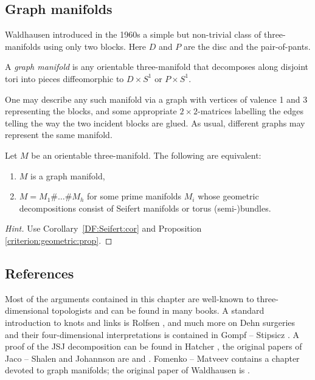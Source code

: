 \subsection{Graph manifolds}
Waldhausen introduced in the 1960s a simple but non-trivial class of three-manifolds using only two blocks. Here $D$ and $P$ are the disc and the pair-of-pants.

\begin{defn}
A \emph{graph manifold} is any orientable three-manifold that decomposes along disjoint tori into pieces diffeomorphic to $D\times S^1$ or $P\times S^1$.
\end{defn}

One may describe any such manifold via a graph with vertices of valence 1 and 3 representing the blocks, and some appropriate $2\times 2$-matrices labelling the edges telling the way the two incident blocks are glued. As usual, different graphs may represent the same manifold. 

\begin{ex}
Let $M$ be an orientable three-manifold. The following are equivalent:
\begin{enumerate}
\item $M$ is a graph manifold,
\item $M=M_1\#\ldots \#M_h$ for some prime manifolds $M_i$ whose geometric decompositions consist of Seifert manifolds or torus (semi-)bundles.
\end{enumerate} 
\end{ex}
\begin{proof}[Hint]
Use Corollary~\ref{DF:Seifert:cor} and Proposition \ref{criterion:geometric:prop}. 
\end{proof}

\subsection{References}
Most of the arguments contained in this chapter are well-known to three-dimensional topologists and can be found in many books. A standard introduction to knots and links is Rolfsen \cite{Ro}, and much more on Dehn surgeries and their four-dimensional interpretations is contained in Gompf -- Stipsicz \cite{GS}. A proof of the JSJ decomposition can be found in Hatcher \cite{H}, the original papers of Jaco -- Shalen and Johannson are \cite{JS} and \cite{Jo}. Fomenko -- Matveev \cite{FM} contains a chapter devoted to graph manifolds; the original paper of Waldhausen is \cite{Wa}.

